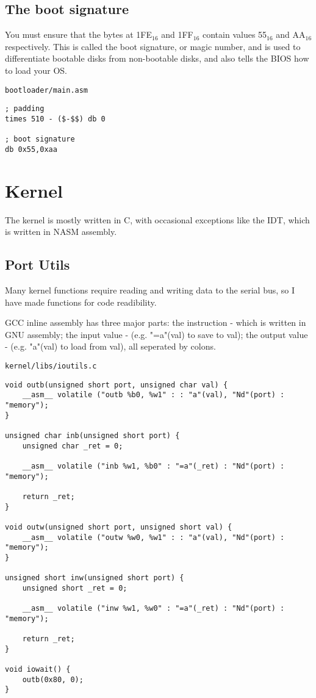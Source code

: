 \documentclass{article}
\begin{document}
\subsection{The boot signature}

You must ensure that the bytes at 1FE$_{16}$ and 1FF$_{16}$
contain values 55$_{16}$ and AA$_{16}$ respectively\cite{55aa}.
This is called the boot signature, or magic number, and is used to differentiate
bootable disks from non-bootable disks, and also tells the BIOS how to load your OS.

\begin{verbatim}
bootloader/main.asm
\end{verbatim}
\begin{verbatim}
; padding
times 510 - ($-$$) db 0

; boot signature
db 0x55,0xaa
\end{verbatim}

\newpage

\section{Kernel}

The kernel is mostly written in C, with occasional exceptions like the IDT,
which is written in NASM assembly.

\subsection{Port Utils}

Many kernel functions require reading and writing data to the
serial bus, so I have made functions for code readibility.

GCC inline assembly has three major parts:
the instruction - which is written in GNU assembly;
the input value - (e.g. "=a"(val) to save to val);
the output value - (e.g. "a"(val) to load from val),
all seperated by colons.

\begin{verbatim}
kernel/libs/ioutils.c
\end{verbatim}
\begin{verbatim}
void outb(unsigned short port, unsigned char val) {
	__asm__ volatile ("outb %b0, %w1" : : "a"(val), "Nd"(port) : "memory");
}

unsigned char inb(unsigned short port) {
	unsigned char _ret = 0;

	__asm__ volatile ("inb %w1, %b0" : "=a"(_ret) : "Nd"(port) : "memory");

	return _ret;
}

void outw(unsigned short port, unsigned short val) {
	__asm__ volatile ("outw %w0, %w1" : : "a"(val), "Nd"(port) : "memory");
}

unsigned short inw(unsigned short port) {
	unsigned short _ret = 0;

	__asm__ volatile ("inw %w1, %w0" : "=a"(_ret) : "Nd"(port) : "memory");

	return _ret;
}

void iowait() {
	outb(0x80, 0);
}
\end{verbatim}
\end{document}
